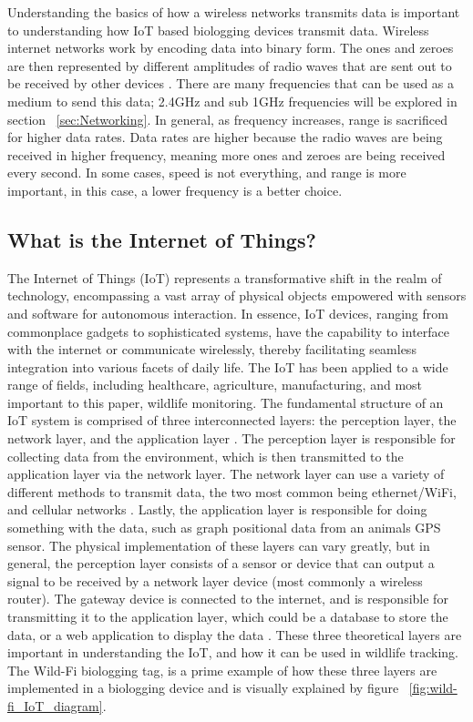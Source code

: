 \documentclass[sigplan,screen,nonacm]{acmart}
\begin{document}
Understanding the basics of how a wireless networks transmits data is important to understanding 
how IoT based biologging devices transmit data. Wireless internet networks work by encoding data 
into binary form. The ones and zeroes are then represented by different amplitudes of radio waves 
that are sent out to be received by other devices \cite{Ghimire_2023}. There are many frequencies that can 
be used as a medium to send this data; 2.4GHz and sub 1GHz frequencies will be explored in section ~\ref{sec:Networking}. 
In general, as frequency increases, range is sacrificed for higher data rates\cite{Netgear}. Data rates are 
higher because the radio waves are being received in higher frequency, meaning more ones and zeroes are being received every second. In 
some cases, speed is not everything, and range is more important, in this case, a lower frequency 
is a better choice.

\subsection{What is the Internet of Things?}
\label{subsec:What is the Internet of Things}

The Internet of Things (IoT) represents a transformative shift in the
realm of technology, encompassing a vast array of physical objects empowered
with sensors and software for autonomous interaction. In essence, IoT devices, ranging
from commonplace gadgets to sophisticated systems, have the capability to
interface with the internet or communicate wirelessly, thereby facilitating
seamless integration into various facets of daily life. The IoT has been
applied to a wide range of fields, including healthcare, agriculture,
manufacturing, and most important to this paper, wildlife monitoring.
The fundamental structure of an IoT system is comprised of three
interconnected layers: the perception layer, the network layer, and the
application layer \cite{kumar2019internet}. The perception layer is responsible for collecting data
from the environment, which is then transmitted to the application layer via the network layer.
The network layer can use a variety of different methods to transmit data, the two most common being
ethernet/WiFi, and cellular networks \cite{greengard2021internet}. Lastly, the application
layer is responsible for doing something with the data, such as graph positional data from an
animals GPS sensor. The physical implementation of these layers
can vary greatly, but in general, the perception layer consists of a sensor or device that can
output a signal to be received by a network layer device (most commonly a wireless router). The gateway device is connected to
the internet, and is responsible for transmitting it to the application layer, which could be a database to store 
the data, or a web application to display the data \cite{kumar2019internet}. These three theoretical 
layers are important in understanding the IoT,
and how it can be used in wildlife tracking. The Wild-Fi biologging tag, is a prime example 
of how these three layers are implemented in a biologging device and is visually explained 
by figure ~\ref{fig:wild-fi_IoT_diagram}.
\end{document}
